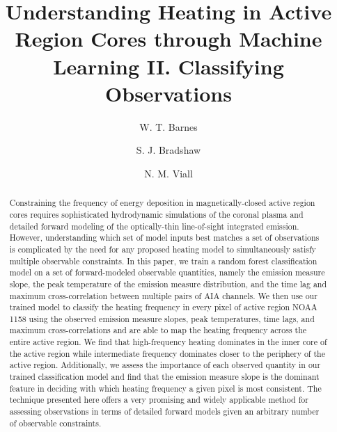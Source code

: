 \documentclass[modern,linenumbers,longauthor,trackchanges]{aastex63}
\newcommand{\AR}{active region}
\begin{document}
\title{Understanding Heating in Active Region Cores through Machine Learning II. Classifying Observations}
\author[0000-0001-9642-6089]{W. T. Barnes}
\author[0000-0002-3300-6041]{S. J. Bradshaw}
\author[0000-0003-1692-1704]{N. M. Viall}

\begin{abstract}
Constraining the frequency of energy deposition in magnetically-closed \AR{} cores requires sophisticated hydrodynamic simulations of the coronal plasma and detailed forward modeling of the optically-thin line-of-sight integrated emission.
However, understanding which set of model inputs best matches a set of observations is complicated by the need for any proposed heating model to simultaneously satisfy multiple observable constraints.
In this paper, we train a random forest classification model on a set of forward-modeled observable quantities, namely the emission measure slope, the peak temperature of the emission measure distribution, and the time lag and maximum cross-correlation between multiple pairs of AIA channels.
We then use our trained model to classify the heating frequency in every pixel of \AR{} NOAA 1158 using the observed emission measure slopes, peak temperatures, time lags, and maximum cross-correlations and are able to map the heating frequency across the entire active region.
We find that high-frequency heating dominates in the inner core of the \AR{} while intermediate frequency dominates closer to the periphery of the \AR{}.
Additionally, we assess the importance of each observed quantity in our trained classification model and find that the emission measure slope is the dominant feature in deciding with which heating frequency a given pixel is most consistent.
The technique presented here offers a very promising and widely applicable method for assessing observations in terms of detailed forward models given an arbitrary number of observable constraints.
\end{abstract}
\end{document}
